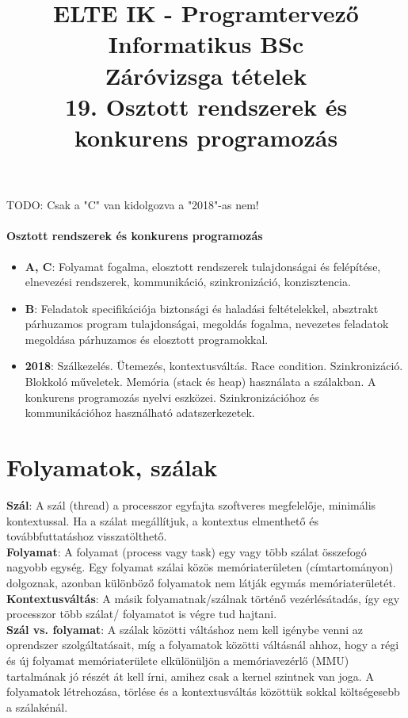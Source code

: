 \documentclass[margin=0px]{article}
\title{\textbf{{\Large ELTE IK - Programtervező Informatikus BSc} \vspace{0.2cm} \\ {\huge Záróvizsga tételek}} \vspace{0.3cm} \\ 19. Osztott rendszerek és konkurens programozás}
\author{}
\date{}
\newenvironment{tetel}[1]{\paragraph{#1}}{}
\begin{document}
\maketitle

TODO: Csak a "C" van kidolgozva a "2018"-as nem!

\begin{tetel}{Osztott rendszerek és konkurens programozás}
    \begin{itemize}
        \item[] \textbf{A, C}: Folyamat fogalma, elosztott rendszerek tulajdonságai és felépítése, elnevezési rendszerek, kommunikáció, szinkronizáció, konzisztencia.
        \item[] \textbf{B}: Feladatok specifikációja biztonsági és haladási feltételekkel, absztrakt párhuzamos program tulajdonságai, megoldás fogalma, nevezetes feladatok megoldása párhuzamos és elosztott programokkal.
        \item[] \textbf{2018}: Szálkezelés. Ütemezés, kontextusváltás. Race condition. Szinkronizáció. Blokkoló műveletek. Memória (stack és heap) használata a szálakban. A konkurens programozás nyelvi eszközei. Szinkronizációhoz és kommunikációhoz használható adatszerkezetek.
    \end{itemize}
\end{tetel}

\section{Folyamatok, szálak}

\noindent \textbf{Szál}: A szál (thread) a processzor egyfajta szoftveres megfelelője, minimális kontextussal. Ha a szálat
megállítjuk, a kontextus elmenthető és továbbfuttatáshoz visszatölthető.\\

\noindent \textbf{Folyamat}: A folyamat (process vagy task) egy vagy több szálat összefogó nagyobb egység. Egy folyamat
szálai közös memóriaterületen (címtartományon) dolgoznak, azonban különböző folyamatok nem látják egymás memóriaterületét.\\

\noindent \textbf{Kontextusváltás}: A másik folyamatnak/szálnak történő vezérlésátadás, így egy processzor több szálat/ folyamatot
is végre tud hajtani.\\

\noindent \textbf{Szál vs. folyamat}: A szálak közötti váltáshoz nem kell igénybe venni az oprendszer szolgáltatásait, míg
a folyamatok közötti váltásnál ahhoz, hogy a régi és új folyamat memóriaterülete elkülönüljön a memóriavezérlő (MMU)
tartalmának jó részét át kell írni, amihez csak a kernel szintnek van joga. A folyamatok létrehozása, törlése és a kontextusváltás
közöttük sokkal költségesebb a szálakénál.
\end{document}
